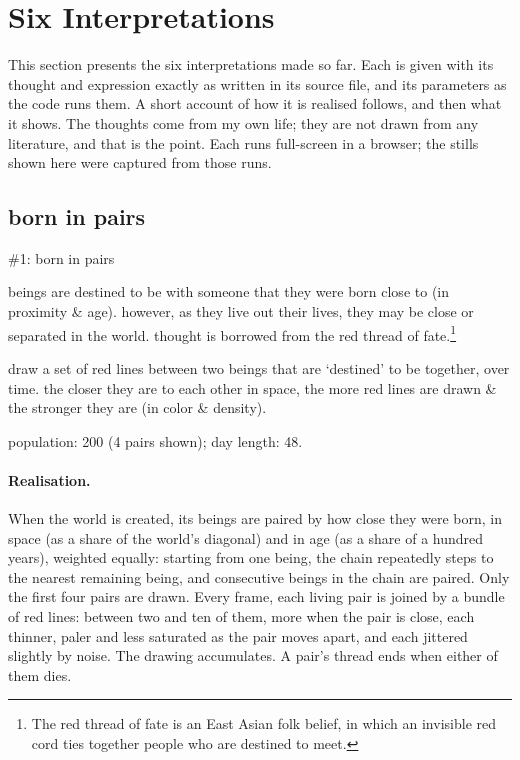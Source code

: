 \section{Six Interpretations}
\label{sec:interpretations}

This section presents the six interpretations made so far. Each is given with its thought and expression exactly as written in its source file, and its parameters as the code runs them. A short account of how it is realised follows, and then what it shows. The thoughts come from my own life; they are not drawn from any literature, and that is the point. Each runs full-screen in a browser; the stills shown here were captured from those runs.

\subsection{born in pairs}
\label{sec:pairs}

\begin{interpretation}{\#1: born in pairs}
  \item[thought] beings are destined to be with someone that they were born close to (in proximity \& age). however, as they live out their lives, they may be close or separated in the world. thought is borrowed from the red thread of fate.\footnote{The red thread of fate is an East Asian folk belief, in which an invisible red cord ties together people who are destined to meet.}
  \item[expression] draw a set of red lines between two beings that are `destined' to be together, over time. the closer they are to each other in space, the more red lines are drawn \& the stronger they are (in color \& density).
  \item[parameters] population: 200 (4 pairs shown); day length: 48.
\end{interpretation}

\paragraph{Realisation.} When the world is created, its beings are paired by how close they were born, in space (as a share of the world's diagonal) and in age (as a share of a hundred years), weighted equally: starting from one being, the chain repeatedly steps to the nearest remaining being, and consecutive beings in the chain are paired. Only the first four pairs are drawn. Every frame, each living pair is joined by a bundle of red lines: between two and ten of them, more when the pair is close, each thinner, paler and less saturated as the pair moves apart, and each jittered slightly by noise. The drawing accumulates. A pair's thread ends when either of them dies.

